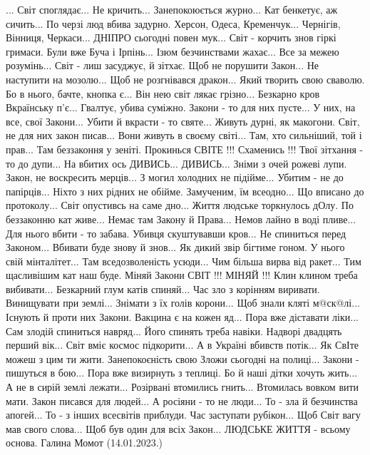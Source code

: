 \raggedcolumns
\begin{multicols}{2} %
\setlength{\parindent}{0pt}
\obeycr
... Світ споглядає... Не кричить...
Занепокоюється журно...
Кат бенкетує, аж сичить...
По черзі люд вбива задурно.
Херсон, Одеса, Кременчук...
Чернігів, Вінниця, Черкаси...
ДНІПРО сьогодні повен мук...
Світ - корчить знов гіркі гримаси.
Були вже Буча і Ірпінь...
Ізюм безчинствами жахає...
Все за межею розумінь...
Світ - лиш засуджує, й зітхає.
Щоб не порушити Закон...
Не наступити на мозолю...
Щоб не розгнівався дракон...
Який творить свою сваволю.
Бо в нього, бачте, кнопка є...
Він нею світ лякає грізно...
Безкарно кров Вкраїнську п'є...
Гвалтує, убива суміжно.
Закони - то для них пусте...
У них, на все, свої Закони...
Убити й вкрасти - то святе...
Живуть дурні, як макогони.
Світ, не для них закон писав...
Вони живуть в своєму світі...
Там, хто сильніший, той і прав...
Там беззаконня у зеніті.
Прокинься СВІТЕ !!!  Схаменись !!!
Твої зітхання - то до дупи...
На вбитих ось ДИВИСЬ...  ДИВИСЬ...
Зніми з очей рожеві лупи.
Закон, не воскресить мерців...
З могил холодних не підійме...
Убитим - не до папірців...
Ніхто з них рідних не обійме.
Замученим, їм всеодно...
Що вписано до протоколу...
Світ опустивсь на саме дно...
Життя людське торкнулось дОлу.
По беззаконню кат живе...
Немає там Закону й Права...
Немов лайно в воді пливе...
Для нього вбити - то забава.
Убивця скуштувавши кров...
Не спиниться перед Законом...
Вбивати буде знову й знов...
Як дикий звір бігтиме гоном.
У нього свій мінталітет...
Там вседозволеність усюди...
Чим більша вирва від ракет...
Тим щасливішим кат наш буде.
Міняй Закони СВІТ !!!   МІНЯЙ !!!
Клин клином треба вибивати...
Безкарний глум катів спиняй...
Час зло з корінням виривати.
Винищувати при землі...
Знімати з їх голів корони...
Щоб знали кляті м@ск@лі...
Існують й проти них Закони.
Вакцина є на кожен яд...
Пора вже діставати ліки...
Сам злодій спиниться навряд...
Його спинять треба навіки.
Надворі двадцять перший вік...
Світ вміє космос підкорити...
А в Україні вбивств потік...
Як СвІте можеш з цим ти жити.
Занепокоєність свою
Зложи сьогодні на полиці...
Закони - пишуться в бою...
Пора вже визирнуть з теплиці.
Бо й наші дітки  хочуть жить...
А не в сирій землі лежати...
Розірвані втомились гнить...
Втомилась вовком вити мати.
Закон писався для людей...
А росіяни - то не люди...
То - зла й безчинства апогей...
То - з інших всесвітів приблуди.
Час заступати рубікон...
Щоб Світ вагу мав свого слова...
Щоб був один для всіх Закон...
ЛЮДСЬКЕ ЖИТТЯ - всьому основа.
Галина Момот (14.01.2023.)
\restorecr
\end{multicols} %
